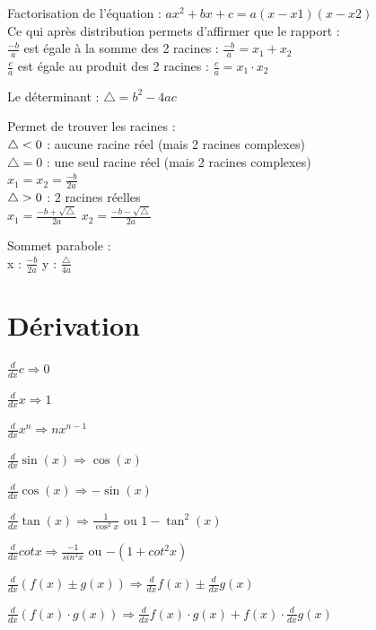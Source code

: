\documentclass[a4paper,12pt]{article}
\newcommand\tab[1][]{\hspace*{#1}}
\newcommand{\lt}{\ensuremath <}
\newcommand{\gt}{\ensuremath >}
\begin{document}
Factorisation de l'équation : $ax^2 + bx + c = a(x - x1)(x - x2)$ \\
\tab[1cm] Ce qui après distribution permets d'affirmer que le rapport : \\
\tab[2cm] $\frac{-b}{a}$ est égale à la somme des 2 racines : $\frac{-b}{a} = x_1 + x_2$ \\
\tab[2cm] $\frac{c}{a}$ est égale au produit des 2 racines : $\frac{c}{a} = x_1 \cdot  x_2$

\vspace{\baselineskip}
Le déterminant : $\triangle = b^2 - 4ac$ 

Permet de trouver les racines : \\
\tab[1cm] $\triangle \lt 0 $ : aucune racine réel (mais 2 racines complexes)\\
\tab[1cm] $\triangle = 0 $ : une seul racine réel (mais 2 racines complexes)\\
\tab[2cm] $x_1 = x_2 = \frac{-b}{2a}$\\
\tab[1cm] $\triangle \gt 0 $ : 2 racines réelles\\
\tab[2cm] $x_1 = \frac{-b + \sqrt{\triangle} }{2a} $
\tab[1cm] $x_2 = \frac{-b - \sqrt{\triangle} }{2a} $

\vspace{\baselineskip}
Sommet parabole : \\
\tab[1cm] x : $\frac{-b}{2a} $
\tab[1cm] y : $\frac{\triangle }{4a} $

\newpage
\section{Dérivation}

$\frac{d}{dx} c \Rightarrow 0$

$\frac{d}{dx} x \Rightarrow 1$

$\frac{d}{dx} x^n \Rightarrow nx^{n-1}$

$\frac{d}{dx} \sin(x)  \Rightarrow \cos(x)$

$\frac{d}{dx} \cos(x)  \Rightarrow -\sin(x)$

$\frac{d}{dx} \tan(x)  \Rightarrow \frac{1}{\cos^2x}$ ou $1-\tan^2(x)$

$\frac{d}{dx}  cot x \Rightarrow \frac{-1}{sin^2 x}$ ou $-(1+cot^2 x)$

$\frac{d}{dx} (f(x)\pm g(x)) \Rightarrow \frac{d}{dx} f(x) \pm \frac{d}{dx} g(x)$

$\frac{d}{dx} (f(x)\cdot  g(x)) \Rightarrow \frac{d}{dx} f(x) \cdot g(x) + f(x) \cdot \frac{d}{dx} g(x)$
\end{document}
